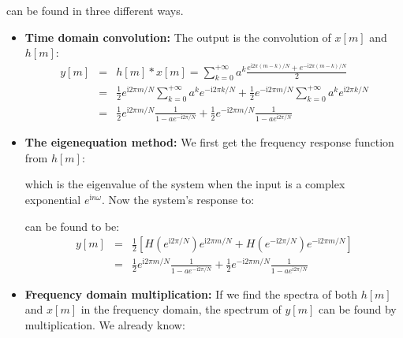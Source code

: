 	can be found in three different ways.
	\begin{itemize}
	\item {\bf Time domain convolution: } The output is the convolution of
	$x[m]$ and $h[m]$:
	\begin{eqnarray}
	y[m] &=& h[m]*x[m]=\sum_{k=0}^{+\infty} a^k \frac{e^{\mathrm{i}2\pi (m-k)/N}+e^{-\mathrm{i}2\pi (m-k)/N}}{2}
		\nonumber \\
	 &=& \frac{1}{2}e^{\mathrm{i}2\pi m/N}\sum_{k=0}^{+\infty} a^k e^{-\mathrm{i}2\pi k/N}
		+\frac{1}{2}e^{-\mathrm{i}2\pi m/N}\sum_{k=0}^{+\infty} a^k e^{\mathrm{i}2\pi k/N}
		\nonumber \\
	 &=& \frac{1}{2}e^{\mathrm{i}2\pi m/N}\frac{1}{1-ae^{-\mathrm{i}2\pi /N}}
		+\frac{1}{2}e^{-\mathrm{i}2\pi m/N}\frac{1}{1-ae^{\mathrm{i}2\pi /N}}
		\nonumber
	\end{eqnarray}
	
	\item {\bf The eigenequation method:} We first get the frequency response function from $h[m]$:
	
	which is the eigenvalue of the system when the input is a complex exponential $e^{\mathrm{i}n\omega}$. Now the system's response to: 
	
	can be found to be:
	\begin{eqnarray}
	y[m] &=& \frac{1}{2}\left[H(e^{\mathrm{i}2\pi/N})e^{\mathrm{i}2\pi m/N}+H(e^{-\mathrm{i}2\pi/N})e^{-\mathrm{i}2\pi m/N}\right]
		\nonumber \\
	 &=& \frac{1}{2}e^{\mathrm{i}2\pi m/N}\frac{1}{1-ae^{-\mathrm{i}2\pi /N}}
		+\frac{1}{2}e^{-\mathrm{i}2\pi m/N}\frac{1}{1-ae^{\mathrm{i}2\pi /N}}	
		\nonumber 
	\end{eqnarray}
	
	\item {\bf Frequency domain multiplication:} If we find the spectra of both $h[m]$ and $x[m]$ in the frequency domain, the spectrum of $y[m]$ can be found by multiplication. We already know:
	

\end{itemize}
